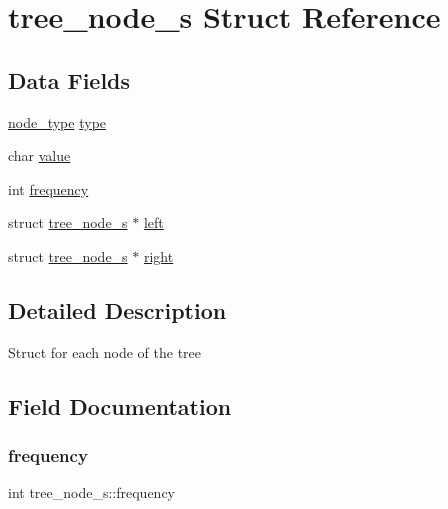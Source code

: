 \hypertarget{structtree__node__s}{}\section{tree\+\_\+node\+\_\+s Struct Reference}
\label{structtree__node__s}
\subsection*{Data Fields}
\begin{DoxyCompactItemize}
\item 
\mbox{\hyperlink{list_8h_a6a276b85e2da28c5f9c3dbce61c55682}{node\+\_\+type}} \mbox{\hyperlink{structtree__node__s_a090b69b8f438d25df237e4b217eac3e5}{type}}
\item 
char \mbox{\hyperlink{structtree__node__s_a3f82a6355d2a50f51dcafd8217aa8e20}{value}}
\item 
int \mbox{\hyperlink{structtree__node__s_a7e262397f763e17ed038e673cbc9f520}{frequency}}
\item 
struct \mbox{\hyperlink{structtree__node__s}{tree\+\_\+node\+\_\+s}} $\ast$ \mbox{\hyperlink{structtree__node__s_a06f95eb6b6b6d8b13c83d797532ecc2f}{left}}
\item 
struct \mbox{\hyperlink{structtree__node__s}{tree\+\_\+node\+\_\+s}} $\ast$ \mbox{\hyperlink{structtree__node__s_abed0324b1cb4a573e75d7bc58c555332}{right}}
\end{DoxyCompactItemize}


\subsection{Detailed Description}
Struct for each node of the tree 

\subsection{Field Documentation}
\mbox{\label{structtree__node__s_a7e262397f763e17ed038e673cbc9f520}} 
\subsubsection{\texorpdfstring{frequency}{frequency}}
{\footnotesize\ttfamily int tree\+\_\+node\+\_\+s\+::frequency}

